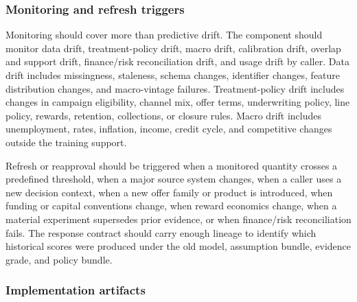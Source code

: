 \documentclass[11pt]{article}
\newcommand{\1}{\mathbf{1}}
\begin{document}
\subsubsection{Monitoring and refresh triggers}
\label{subsec:monitoring-refresh}

Monitoring should cover more than predictive drift. The component should
monitor data drift, treatment-policy drift, macro drift, calibration drift,
overlap and support drift, finance/risk reconciliation drift, and usage drift
by caller. Data drift includes missingness, staleness, schema changes,
identifier changes, feature distribution changes, and macro-vintage failures.
Treatment-policy drift includes changes in campaign eligibility, channel mix,
offer terms, underwriting policy, line policy, rewards, retention, collections,
or closure rules. Macro drift includes unemployment, rates, inflation, income,
credit cycle, and competitive changes outside the training support.

Refresh or reapproval should be triggered when a monitored quantity crosses a
predefined threshold, when a major source system changes, when a caller uses a
new decision context, when a new offer family or product is introduced, when
funding or capital conventions change, when reward economics change, when a
material experiment supersedes prior evidence, or when finance/risk
reconciliation fails. The response contract should carry enough lineage to
identify which historical scores were produced under the old model,
assumption bundle, evidence grade, and policy bundle.

\subsubsection{Implementation artifacts}
\label{subsec:implementation-artifacts}
\end{document}
